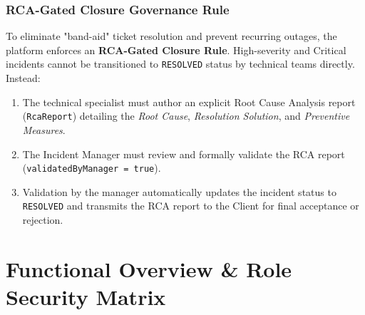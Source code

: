 \documentclass[12pt,a4paper]{report}
\begin{document}
\subsection{RCA-Gated Closure Governance Rule}
To eliminate "band-aid" ticket resolution and prevent recurring outages, the platform enforces an \textbf{RCA-Gated Closure Rule}. High-severity and Critical incidents cannot be transitioned to \texttt{RESOLVED} status by technical teams directly. Instead:
\begin{enumerate}
    \item The technical specialist must author an explicit Root Cause Analysis report (\texttt{RcaReport}) detailing the \emph{Root Cause}, \emph{Resolution Solution}, and \emph{Preventive Measures}.
    \item The Incident Manager must review and formally validate the RCA report (\texttt{validatedByManager = true}).
    \item Validation by the manager automatically updates the incident status to \texttt{RESOLVED} and transmits the RCA report to the Client for final acceptance or rejection.
\end{enumerate}

\chapter{Functional Overview \& Role Security Matrix}
\end{document}
